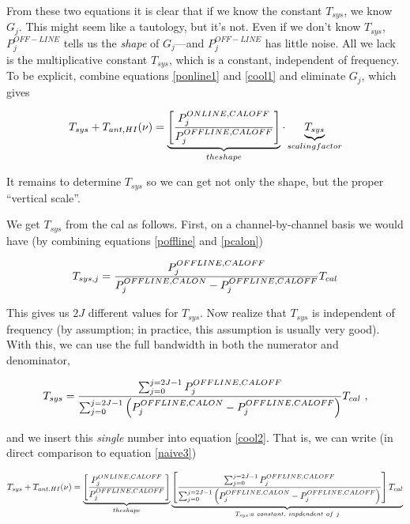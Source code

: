 \noindent From these two equations it is clear that if we know the
constant $T_{sys}$, we know $G_j$. This might seem like a tautology, but
it's not. Even if we don't know $T_{sys}$, $P_j^{OFF-LINE}$ tells us the
{\it shape} of $G_j$---and $P_j^{OFF-LINE}$ has little noise. All we
lack is the multiplicative constant $T_{sys}$, which is a constant,
independent of frequency. To be explicit, combine equations
\ref{ponline1} and \ref{cool1} and eliminate $G_j$, which gives

\begin{equation} \label{cool2}
T_{sys} + T_{ant, HI}(\nu) = 
\underbrace{\left[ {P_j^{ONLINE, CALOFF} \over P_j^{OFFLINE, CALOFF}} 
\right]}_{the shape} \cdot
\underbrace{ T_{sys}}_{scaling factor}   
\end{equation}

\noindent It remains to determine $T_{sys}$ so we can
get not only the shape, but the proper ``vertical scale''. 

	We get $T_{sys}$ from the cal as follows. First, on a
channel-by-channel basis we would have (by combining equations
\ref{poffline} and \ref{pcalon})

\begin{equation} \label{cool3}
T_{sys,j} = {P_j^{OFFLINE,CALOFF} \over 
	P_j^{OFFLINE,CALON} - P_j^{OFFLINE,CALOFF} } T_{cal}
\end{equation}

\noindent This gives us $2J$ different values for $T_{sys}$. Now realize
that $T_{sys}$ is independent of frequency (by assumption; in practice,
this assumption is usually very good). With this, we can use the full
bandwidth in both the numerator and denominator, 

\begin{equation} \label{cool3a}
T_{sys} =  {\sum_{j=0}^{j=2J-1} P_j^{OFFLINE,CALOFF} \over 
             \sum_{j=0}^{j=2J-1} \left(
P_j^{OFFLINE,CALON} - P_j^{OFFLINE,CALOFF} \right) } T_{cal} \ ,
\end{equation}

\noindent and we insert this {\it single} number into equation
\ref{cool2}. That is, we can write (in direct comparison to equation
\ref{naive3})

\begin{small}
\begin{equation} \label{cool4}
T_{sys} + T_{ant, HI}(\nu) =
\underbrace{ \left[ {P_j^{ONLINE, CALOFF} \over P_j^{OFFLINE, CALOFF}}
\right] }_{the shape}
\underbrace{ \left[ 
{\sum_{j=0}^{j=2J-1} P_j^{OFFLINE,CALOFF} \over 
             \sum_{j=0}^{j=2J-1} \left(
P_j^{OFFLINE,CALON} - P_j^{OFFLINE,CALOFF}  \right) } \right] T_{cal}}
	_{T_{sys}:a \ constant,\ inpdendent \ of \ j}
\end{equation}
\end{small}

